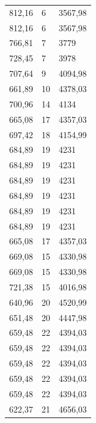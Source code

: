 \begin{center}
\begin{longtable}{|l|l|l|}
812,16            & 6                & 3567,98        \\
812,16            & 6                & 3567,98        \\
766,81            & 7                & 3779           \\
728,45            & 7                & 3978           \\
707,64            & 9                & 4094,98        \\
661,89            & 10               & 4378,03        \\
700,96            & 14               & 4134           \\
665,08            & 17               & 4357,03        \\
697,42            & 18               & 4154,99        \\
684,89            & 19               & 4231           \\
684,89            & 19               & 4231           \\
684,89            & 19               & 4231           \\
684,89            & 19               & 4231           \\
684,89            & 19               & 4231           \\
684,89            & 19               & 4231           \\
665,08            & 17               & 4357,03        \\
669,08            & 15               & 4330,98        \\
669,08            & 15               & 4330,98        \\
721,38            & 15               & 4016,98        \\
640,96            & 20               & 4520,99        \\
651,48            & 20               & 4447,98        \\
659,48            & 22               & 4394,03        \\
659,48            & 22               & 4394,03        \\
659,48            & 22               & 4394,03        \\
659,48            & 22               & 4394,03        \\
659,48            & 22               & 4394,03        \\
622,37            & 21               & 4656,03        \\

\end{longtable}
\end{center}
